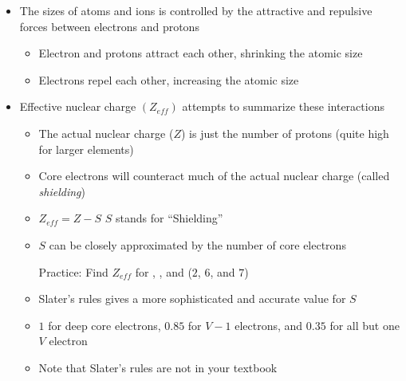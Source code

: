 \documentclass[12pt, openany, letterpaper]{memoir}
\begin{document}
\begin{itemize}
  \item The sizes of atoms and ions is controlled by the attractive and repulsive forces between electrons and protons
    \begin{itemize}
      \item Electron and protons attract each other, shrinking the atomic size
      \item Electrons repel each other, increasing the atomic size
    \end{itemize}
	\item Effective nuclear charge $\left(Z_{eff}\right)$ attempts to summarize these interactions
    \begin{itemize}
      \item The actual nuclear charge ($Z$) is just the number of protons (quite high for larger elements)
      \item Core electrons will counteract much of the actual nuclear charge (called \emph{shielding})
      \item $Z_{eff} = Z-S$ \hspace{2em} $S$ stands for ``Shielding''
      \item $S$ can be closely approximated by the number of core electrons

            Practice: Find $Z_{eff}$ for , , and  ($2$, $6$, and $7$)
      \item Slater's rules gives a more sophisticated and accurate value for $S$
      \item $1$ for deep core electrons, $0.85$ for $V-1$ electrons, and $0.35$ for all but one $V$ electron
      \item Note that Slater's rules are not in your textbook


\end{itemize}
\end{itemize}
\end{document}
